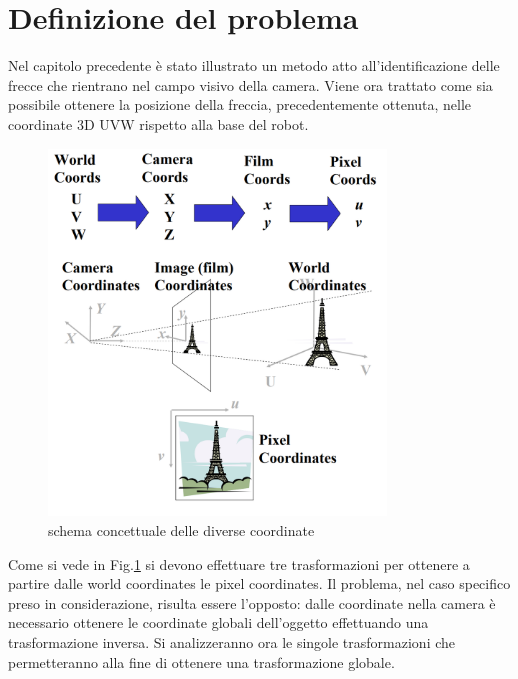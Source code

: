 \section{Definizione del problema}
Nel capitolo precedente è stato illustrato un metodo atto all'identificazione delle frecce che rientrano nel campo visivo della camera. Viene ora trattato come sia possibile ottenere la posizione della freccia, precedentemente ottenuta, nelle coordinate 3D UVW rispetto alla base del robot.

\begin{figure}[H]
	\centering
	\includegraphics[width=0.8\textwidth]{Immagini/world_coords.png}
	\caption{schema concettuale delle diverse coordinate}
	\label{fig:fromcamtoworld}
\end{figure}

Come si vede in Fig.\ref{fig:fromcamtoworld} si devono effettuare tre trasformazioni per ottenere a partire dalle world coordinates le pixel coordinates.
Il problema, nel caso specifico preso in considerazione, risulta essere l'opposto: dalle coordinate nella camera è necessario ottenere le coordinate globali dell'oggetto effettuando una trasformazione inversa.
Si analizzeranno ora le singole trasformazioni che permetteranno alla fine di ottenere una trasformazione globale.

